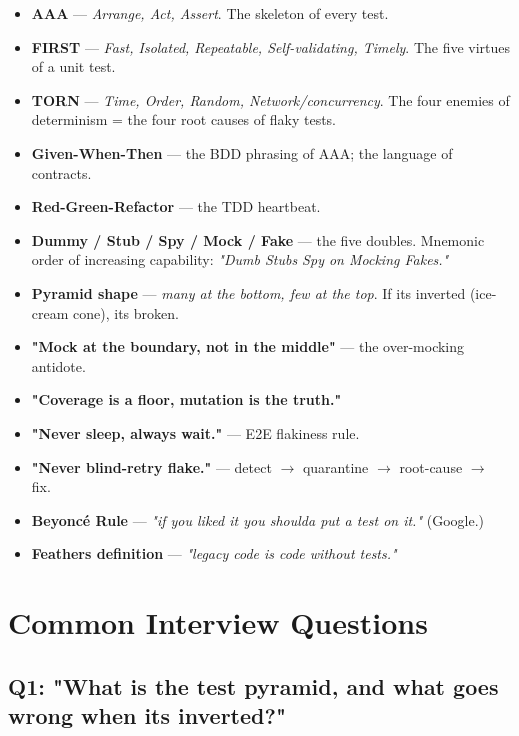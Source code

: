 \documentclass[11pt]{article}
\providecommand{\tightlist}{\setlength{\itemsep}{1pt}\setlength{\parskip}{0pt}}
\begin{document}
\begin{itemize}
\tightlist
\item
  \textbf{AAA} --- \emph{Arrange, Act, Assert}. The skeleton of every test.
\item
  \textbf{FIRST} --- \emph{Fast, Isolated, Repeatable, Self-validating, Timely}. The five virtues of a unit test.
\item
  \textbf{TORN} --- \emph{Time, Order, Random, Network/concurrency}. The four enemies of determinism = the four root causes of flaky tests.
\item
  \textbf{Given-When-Then} --- the BDD phrasing of AAA; the language of contracts.
\item
  \textbf{Red-Green-Refactor} --- the TDD heartbeat.
\item
  \textbf{Dummy / Stub / Spy / Mock / Fake} --- the five doubles. Mnemonic order of increasing capability: \emph{"Dumb Stubs Spy on Mocking Fakes."}
\item
  \textbf{Pyramid shape} --- \emph{many at the bottom, few at the top}. If it\textquotesingle s inverted (ice-cream cone), it\textquotesingle s broken.
\item
  \textbf{"Mock at the boundary, not in the middle"} --- the over-mocking antidote.
\item
  \textbf{"Coverage is a floor, mutation is the truth."}
\item
  \textbf{"Never sleep, always wait."} --- E2E flakiness rule.
\item
  \textbf{"Never blind-retry flake."} --- detect \(\rightarrow\) quarantine \(\rightarrow\) root-cause \(\rightarrow\) fix.
\item
  \textbf{Beyoncé Rule} --- \emph{"if you liked it you shoulda put a test on it."} (Google.)
\item
  \textbf{Feathers\textquotesingle{} definition} --- \emph{"legacy code is code without tests."}
\end{itemize}

\section{Common Interview Questions}\label{common-interview-questions}

\subsection{Q1: "What is the test pyramid, and what goes wrong when it\textquotesingle s inverted?"}\label{q1-what-is-the-test-pyramid-and-what-goes-wrong-when-its-inverted}
\end{document}
